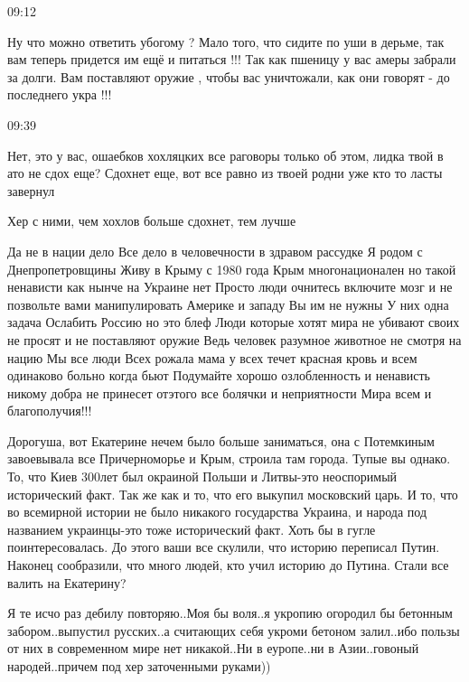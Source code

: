 09:12

Ну что можно ответить убогому ? Мало того, что сидите по уши в дерьме, так вам
теперь придется им ещё и питаться !!! Так как пшеницу у вас амеры забрали за
долги. Вам поставляют оружие , чтобы вас уничтожали, как они говорят - до
последнего укра !!!

09:39

Нет, это у вас, ошаебков хохляцких все раговоры только об этом, лидка твой в
ато не сдох еще? Сдохнет еще, вот все равно из твоей родни уже кто то ласты
завернул

Хер с ними, чем хохлов больше сдохнет, тем лучше


Да не в нации дело Все дело в человечности в здравом рассудке Я родом с
Днепропетровщины Живу в Крыму с 1980 года Крым многонационален но такой
ненависти как нынче на Украине нет Просто люди очнитесь включите мозг и не
позвольте вами манипулировать Америке и западу Вы им не нужны У них одна задача
Ослабить Россию но это блеф Люди которые хотят мира не убивают своих не просят
и не поставляют оружие Ведь человек разумное животное не смотря на нацию Мы все
люди Всех рожала мама у всех течет красная кровь и всем одинаково больно когда
бьют Подумайте хорошо озлобленность и ненависть никому добра не принесет
отэтого все болячки и неприятности Мира всем и благополучия!!!


Дорогуша, вот Екатерине нечем было больше заниматься, она с Потемкиным
завоевывала все Причерноморье и Крым, строила там города. Тупые вы однако. То,
что Киев 300лет был окраиной Польши и Литвы-это неоспоримый исторический факт.
Так же как и то, что его выкупил московский царь. И то, что во всемирной
истории не было никакого государства Украина, и народа под названием
украинцы-это тоже исторический факт. Хоть бы в гугле поинтересовалась. До этого
ваши все скулили, что историю переписал Путин. Наконец сообразили, что много
людей, кто учил историю до Путина. Стали все валить на Екатерину?


Я те исчо раз дебилу повторяю..Моя бы воля..я укропию огородил бы бетонным
забором..выпустил русских..а считающих себя укроми бетоном залил..ибо пользы от
них в современном мире нет никакой..Ни в еуропе..ни в Азии..говоный
народей..причем под хер заточенными руками))


